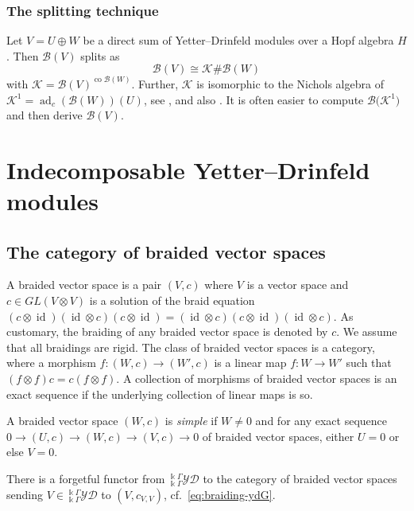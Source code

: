\documentclass[pdftex]{sigma}
\numberwithin{equation}{section}
\newcommand{\adc}{\operatorname{ad}_c}
\newcommand{\co}{\operatorname{co}}
\newcommand{\id}{\operatorname{id}}
\newcommand{\toba}{\mathscr B}
\newcommand{\K}{{\mathcal{K}}}
\newcommand{\yd}[1]{{}_{#1}^{#1}\mathcal{YD}}
\begin{document}
\subsubsection{The splitting technique}\label{subsec:splitting-technique}

Let $V = U \oplus W$ be a direct sum of Yetter--Drinfeld modules over a Hopf algebra $H$.
Then $\toba(V)$ splits as
\begin{equation*} %
\toba(V) \cong \K \# \toba(W)
\end{equation*}
with $\K = \toba(V)^{\co \toba(W)}$.
Further, $\K$ is isomorphic to the Nichols algebra of $\K^1 =\adc (\toba(W))(U)$,
see \cite[Proposition~8.6]{HS-adv}, and also \cite[Lemma~3.2]{AHS}.
It is often easier to compute $\toba\big( \K^1\big)$ and then derive $\toba(V)$.

\section{Indecomposable Yetter--Drinfeld modules}%

\subsection{The category of braided vector spaces}\label{subsec:category-bvs}
A braided vector space is a pair $(V,c)$ where $V$ is a vector space and $c \in GL(V \otimes V)$ is a solution of the braid equation
$(c\otimes \id) (\id \otimes c)(c\otimes \id) = (\id \otimes c)(c\otimes \id)(\id \otimes c)$.
As customary, the braiding of any braided vector space is denoted by $c$.
We assume that all braidings are rigid.
The class of braided vector spaces is a category, where a morphism $f\colon (W, c) \to (W', c)$
is a linear map $f\colon W \to W'$ such that $(f \otimes f)c = c(f \otimes f)$.
A collection of morphisms of braided vector spaces is an exact sequence if the underlying collection of
linear maps is so.

\begin{Definition}
A braided vector space $(W, c)$ is \emph{simple} if $W \neq 0$
and for any exact sequence
$0 \to (U,c) \to (W, c) \to (V,c) \to 0$ of braided vector spaces, either $U=0$ or else $V=0$.
\end{Definition}

There is a forgetful functor from $\yd{\Bbbk\Gamma}$ to the category of braided vector spaces sending
$V \in \yd{\Bbbk\Gamma}$ to $(V, c_{V,V})$, cf.~\eqref{eq:braiding-ydG}.
\end{document}
